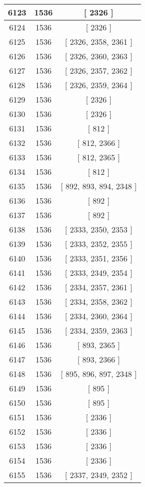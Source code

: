 \begin{center}
\begin{longtable}[H]{|| c c c ||}
\hline
6123 & 1536 & [ 2326 ] \\ 
\hline
6124 & 1536 & [ 2326 ] \\ 
\hline
6125 & 1536 & [ 2326, 2358, 2361 ] \\ 
\hline
6126 & 1536 & [ 2326, 2360, 2363 ] \\ 
\hline
6127 & 1536 & [ 2326, 2357, 2362 ] \\ 
\hline
6128 & 1536 & [ 2326, 2359, 2364 ] \\ 
\hline
6129 & 1536 & [ 2326 ] \\ 
\hline
6130 & 1536 & [ 2326 ] \\ 
\hline
6131 & 1536 & [ 812 ] \\ 
\hline
6132 & 1536 & [ 812, 2366 ] \\ 
\hline
6133 & 1536 & [ 812, 2365 ] \\ 
\hline
6134 & 1536 & [ 812 ] \\ 
\hline
6135 & 1536 & [ 892, 893, 894, 2348 ] \\ 
\hline
6136 & 1536 & [ 892 ] \\ 
\hline
6137 & 1536 & [ 892 ] \\ 
\hline
6138 & 1536 & [ 2333, 2350, 2353 ] \\ 
\hline
6139 & 1536 & [ 2333, 2352, 2355 ] \\ 
\hline
6140 & 1536 & [ 2333, 2351, 2356 ] \\ 
\hline
6141 & 1536 & [ 2333, 2349, 2354 ] \\ 
\hline
6142 & 1536 & [ 2334, 2357, 2361 ] \\ 
\hline
6143 & 1536 & [ 2334, 2358, 2362 ] \\ 
\hline
6144 & 1536 & [ 2334, 2360, 2364 ] \\ 
\hline
6145 & 1536 & [ 2334, 2359, 2363 ] \\ 
\hline
6146 & 1536 & [ 893, 2365 ] \\ 
\hline
6147 & 1536 & [ 893, 2366 ] \\ 
\hline
6148 & 1536 & [ 895, 896, 897, 2348 ] \\ 
\hline
6149 & 1536 & [ 895 ] \\ 
\hline
6150 & 1536 & [ 895 ] \\ 
\hline
6151 & 1536 & [ 2336 ] \\ 
\hline
6152 & 1536 & [ 2336 ] \\ 
\hline
6153 & 1536 & [ 2336 ] \\ 
\hline
6154 & 1536 & [ 2336 ] \\ 
\hline
6155 & 1536 & [ 2337, 2349, 2352 ] \\ 

\end{longtable}
\end{center}
